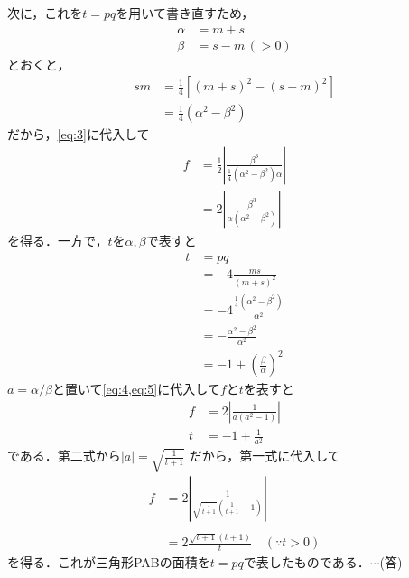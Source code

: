 \documentclass[a4paper,10pt]{ltjsarticle}
\begin{document}
\begin{multicols}{2}
  次に，これを$t=pq$を用いて書き直すため，
  \begin{align*}
    \alpha & =m+s        \\
    \beta  & =s-m\, (>0)
  \end{align*}
  とおくと，
  \begin{align*}
    sm
     & =\frac{1}{4}\left[(m+s)^2-(s-m)^2\right] \\
     & =\frac{1}{4}(\alpha^2-\beta^2)
  \end{align*}
  だから，\cref{eq:3}に代入して
  \begin{align}
    f
     & =\frac{1}{2}\left|\frac{\beta^3}{\frac{1}{4}(\alpha^2-\beta^2)\alpha}\right| \nonumber \\
     & =2\left|\frac{\beta^3}{\alpha(\alpha^2-\beta^2)}\right| \label{eq:4}
  \end{align}
  を得る．一方で，$t$を$\alpha,\beta$で表すと
  \begin{align}
    t
     & = pq                                     \nonumber            \\
     & = -4\frac{ms}{(m+s)^2}                             \nonumber  \\
     & = -4\frac{\frac{1}{4}(\alpha^2-\beta^2)}{\alpha^2}  \nonumber \\
     & =-\frac{\alpha^2-\beta^2}{\alpha^2}                 \nonumber \\
     & =-1+\left(\frac{\beta}{\alpha}\right)^2 \label{eq:5}
  \end{align}
  $a = \alpha/\beta$と置いて\cref{eq:4,eq:5}に代入して$f$と$t$を表すと
  \begin{align*}
    f & =2\left|\frac{1}{a(a^2-1)}\right| \\
    t & =-1+\frac{1}{a^2}
  \end{align*}
  である．第二式から$|a|=\sqrt{\frac{1}{t+1}}$ だから，第一式に代入して
  \begin{align}
    f
     & =2\left|\frac{1}{\sqrt{\frac{1}{t+1}}\left(\frac{1}{t+1}-1\right)}\right| \nonumber \\                                    \\
     & =2\frac{\sqrt{t+1}(t+1)}{t} \quad (\because t>0) \label{eq:6}
  \end{align}
  を得る．これが三角形PABの面積を$t=pq$で表したものである．$\cdots$(答)


\end{multicols}
\end{document}
